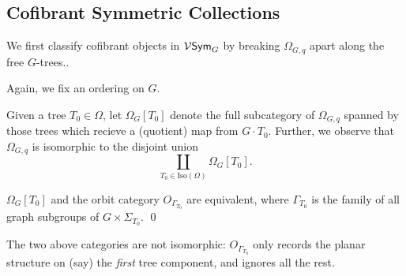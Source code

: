 \documentclass[a4paper,10pt]{article}%
\begin{document}
\subsection{Cofibrant Symmetric Collections}


We first classify cofibrant objects in $\mathcal V\mathsf{Sym}_G$ by breaking $\Omega_{G,q}$ apart along the free $G$-trees.. 

Again, we fix an ordering on $G$.
\begin{definition}
  Given a tree $T_0 \in \Omega$, let $\Omega_G[T_0]$ denote the full subcategory of $\Omega_{G,q}$ spanned by those trees which recieve a (quotient) map from $G\cdot T_0$. Further, we observe that $\Omega_{G,q}$ is isomorphic to the disjoint union
\[
\mathop{\coprod}\limits_{T_0 \in \mathrm{Iso}(\Omega)}\Omega_G[T_0].
\]
\end{definition}

\begin{lemma}
  \label{O_GAMMA_T_0_LEMMA}
  $\Omega_G[T_0]$ and the orbit category $O_{\Gamma_{T_0}}$ are equivalent, where $\Gamma_{T_0}$ is the family of all graph subgroups of $G\times \Sigma_{T_0}$. \qed
\end{lemma}
The two above categories are not isomorphic: $O_{\Gamma_{T_0}}$ only records the planar structure on (say) the \textit{first} tree component, and ignores all the rest.
  


\end{document}
